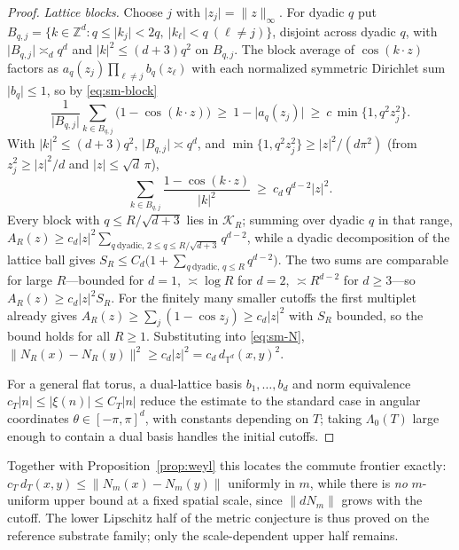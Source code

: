 \documentclass[11pt]{article}
\theoremstyle{remark}
\begin{document}
\begin{proof}
\smallskip\noindent\emph{Lattice blocks.} Choose $j$ with
$\lvert z_j\rvert=\lVert z\rVert_\infty$. For dyadic $q$ put
$B_{q,j}=\{k\in\mathbb Z^d:q\le\lvert k_j\rvert<2q,\ \lvert k_\ell\rvert<q\ (\ell\ne j)\}$,
disjoint across dyadic $q$, with $\lvert B_{q,j}\rvert\asymp_d q^d$ and
$\lvert k\rvert^2\le(d+3)q^2$ on $B_{q,j}$. The block average of $\cos(k\cdot z)$
factors as $a_q(z_j)\prod_{\ell\ne j}b_q(z_\ell)$ with each normalized symmetric
Dirichlet sum $\lvert b_q\rvert\le1$, so by \eqref{eq:sm-block}
\[
\frac1{\lvert B_{q,j}\rvert}\sum_{k\in B_{q,j}}\big(1-\cos(k\cdot z)\big)
\ \ge\ 1-\lvert a_q(z_j)\rvert\ \ge\ c\,\min\{1,q^2z_j^2\}.
\]
With $\lvert k\rvert^2\le(d+3)q^2$, $\lvert B_{q,j}\rvert\asymp q^d$, and
$\min\{1,q^2z_j^2\}\ge\lvert z\rvert^2/(d\pi^2)$ (from $z_j^2\ge\lvert z\rvert^2/d$
and $\lvert z\rvert\le\sqrt d\,\pi$),
\[
\sum_{k\in B_{q,j}}\frac{1-\cos(k\cdot z)}{\lvert k\rvert^2}
\ \ge\ c_d\,q^{d-2}\lvert z\rvert^2.
\]
Every block with $q\le R/\sqrt{d+3}$ lies in $\mathcal K_R$; summing over dyadic $q$
in that range,
$A_R(z)\ge c_d\lvert z\rvert^2\sum_{q\ \mathrm{dyadic},\,2\le q\le R/\sqrt{d+3}}q^{d-2}$,
while a dyadic decomposition of the lattice ball gives
$S_R\le C_d\big(1+\sum_{q\ \mathrm{dyadic},\,q\le R}q^{d-2}\big)$. The two sums are
comparable for large $R$---bounded for $d=1$, $\asymp\log R$ for $d=2$,
$\asymp R^{d-2}$ for $d\ge3$---so $A_R(z)\ge c_d\lvert z\rvert^2S_R$. For the finitely
many smaller cutoffs the first multiplet already gives
$A_R(z)\ge\sum_{j}(1-\cos z_j)\ge c_d\lvert z\rvert^2$ with $S_R$ bounded, so the
bound holds for all $R\ge1$. Substituting into \eqref{eq:sm-N},
$\lVert N_R(x)-N_R(y)\rVert^2\ge c_d\lvert z\rvert^2=c_d\,d_{\mathbb T^d}(x,y)^2$.

For a general flat torus, a dual-lattice basis $b_1,\dots,b_d$ and norm equivalence
$c_T\lvert n\rvert\le\lvert\xi(n)\rvert\le C_T\lvert n\rvert$ reduce the estimate to the
standard case in angular coordinates $\theta\in[-\pi,\pi]^d$, with constants
depending on $T$; taking $\Lambda_0(T)$ large enough to contain a dual basis handles
the initial cutoffs.
\end{proof}

\noindent Together with Proposition~\ref{prop:weyl} this locates the commute
frontier exactly: $c_T\,d_T(x,y)\le\lVert N_m(x)-N_m(y)\rVert$ uniformly in $m$, while
there is \emph{no} $m$-uniform upper bound at a fixed spatial scale, since
$\lVert dN_m\rVert$ grows with the cutoff. The lower Lipschitz half of the metric
conjecture is thus proved on the reference substrate family; only the scale-dependent
upper half remains.
\end{document}
